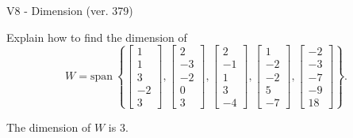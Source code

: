 \begin{exercise}
  \begin{exerciseTitle}V8 - Dimension (ver. 379)\end{exerciseTitle}
  \begin{exerciseStatement}
    Explain how to find the dimension of 
\[W=\mathrm{span}\ \left\{\left[\begin{array}{r}
1 \\
1 \\
3 \\
-2 \\
3
\end{array}\right] , \left[\begin{array}{r}
2 \\
-3 \\
-2 \\
0 \\
3
\end{array}\right] , \left[\begin{array}{r}
2 \\
-1 \\
1 \\
3 \\
-4
\end{array}\right] , \left[\begin{array}{r}
1 \\
-2 \\
-2 \\
5 \\
-7
\end{array}\right] , \left[\begin{array}{r}
-2 \\
-3 \\
-7 \\
-9 \\
18
\end{array}\right]\right\}.\]



  \end{exerciseStatement}
  \begin{exerciseAnswer}
   The dimension of \(W\) is  \(3\).
  


  \end{exerciseAnswer}
\end{exercise}